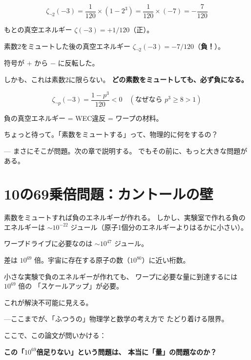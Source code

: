 \documentclass[12pt,a4paper]{article}
\begin{document}
$$
\zeta_{\neg 2}(-3) = \frac{1}{120} \times (1 - 2^3) = \frac{1}{120} \times (-7) = -\frac{7}{120}
$$

\begin{keybox}[符号反転定理]
もとの真空エネルギー $\zeta(-3) = +1/120$（正）。

素数2をミュートした後の真空エネルギー $\zeta_{\neg 2}(-3) = -7/120$（\textbf{負！}）。

符号が $+$ から $-$ に反転した。
\end{keybox}

しかも、これは素数2に限らない。
\textbf{どの素数をミュートしても、必ず負になる。}

$$
\zeta_{\neg p}(-3) = \frac{1-p^3}{120} < 0 \quad (\text{なぜなら } p^3 \geq 8 > 1)
$$

負の真空エネルギー = WEC違反 = ワープの材料。

\begin{questionbox}
ちょっと待って。「素数をミュートする」って、物理的に何をするの？

--- まさにそこが問題。次の章で説明する。
でもその前に、もっと大きな問題がある。
\end{questionbox}

\section{10の69乗倍問題：カントールの壁}
\label{sec:scaling}

素数をミュートすれば負のエネルギーが作れる。
しかし、実験室で作れる負のエネルギーは
$\sim 10^{-22}$ ジュール（原子1個分のエネルギーよりはるかに小さい）。

ワープドライブに必要なのは $\sim 10^{47}$ ジュール。

差は $10^{69}$ 倍。宇宙に存在する原子の数（$10^{80}$）に近い桁数。

\begin{problembox}
小さな実験で負のエネルギーが作れても、
ワープに必要な量に到達するには $10^{69}$ 倍の
「スケールアップ」が必要。

これが解決不可能に見える。

---ここまでが、「ふつうの」物理学と数学の考え方で
たどり着ける限界。
\end{problembox}

ここで、この論文が問いかける：

\textbf{この「$10^{69}$倍足りない」という問題は、
本当に「量」の問題なのか？}
\end{document}
